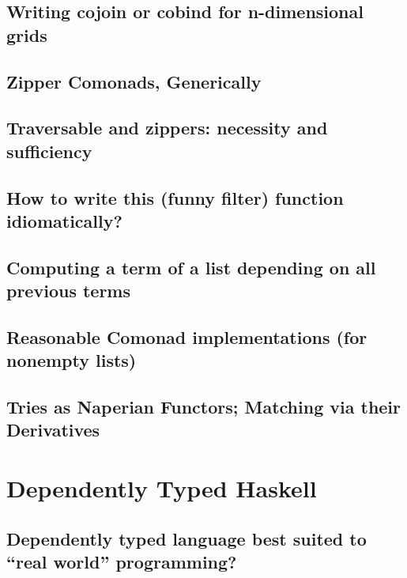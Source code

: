 \documentclass{book}%
\begin{document}
\section{Writing cojoin or cobind for n-dimensional grids}


\section{Zipper Comonads, Generically}


\section{Traversable and zippers: necessity and sufficiency}


\section{How to write this (funny filter) function idiomatically?}


\section{Computing a term of a list depending on all previous terms}


\section{Reasonable Comonad implementations (for nonempty lists)}


\section{Tries as Naperian Functors; Matching via their Derivatives}



\chapter{Dependently Typed Haskell}

\section{Dependently typed language best suited to “real world” programming?}

\end{document}
